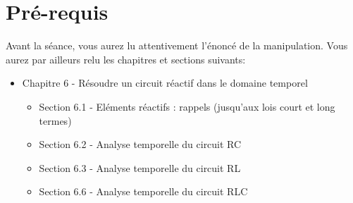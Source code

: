 \pagestyle{fancy}
\cfoot{}





\setlength{\parskip}{0.5cm plus4mm minus3mm} %
\setlength{\parindent}{0pt}





\section{Pré-requis}
Avant la séance, vous aurez lu attentivement l’énoncé de la manipulation. Vous aurez par ailleurs relu les chapitres et sections suivants:
\begin{itemize}
	\item Chapitre 6 - Résoudre un circuit réactif dans le domaine temporel 
	\begin{itemize}
	\item Section 6.1 - Eléments réactifs : rappels  (jusqu’aux lois court et long termes)
	\item Section 6.2 - Analyse temporelle du circuit RC 
	\item Section 6.3 - Analyse temporelle du circuit RL
	\item Section 6.6 - Analyse temporelle du circuit RLC
	\end{itemize}
\end{itemize}


